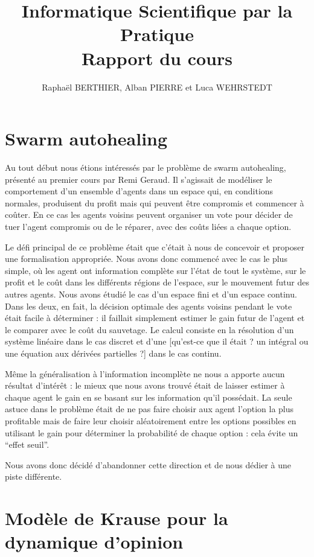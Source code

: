 \documentclass[a4paper,10pt]{article}
\title{Informatique Scientifique par la Pratique\\Rapport du cours}
\author{Raphaël BERTHIER, Alban PIERRE et Luca WEHRSTEDT}
\begin{document}
\maketitle

\section{Swarm autohealing}

Au tout début nous étions intéressés par le problème de swarm autohealing, présenté au premier cours par Remi Geraud. Il s'agissait de modéliser le comportement d'un ensemble d'agents dans un espace qui, en conditions normales, produisent du profit mais qui peuvent être compromis et commencer à coûter. En ce cas les agents voisins peuvent organiser un vote pour décider de tuer l'agent compromis ou de le réparer, avec des coûts liées a chaque option.

Le défi principal de ce problème était que c’était à nous de concevoir et proposer une formalisation appropriée. Nous avons donc commencé avec le cas le plus simple, où les agent ont information complète sur l’état de tout le système, sur le profit et le coût dans les différents régions de l'espace, sur le mouvement futur des autres agents. Nous avons étudié le cas d'un espace fini et d'un espace continu. Dans les deux, en fait, la décision optimale des agents voisins pendant le vote était facile à déterminer : il faillait simplement estimer le gain futur de l'agent et le comparer avec le coût du sauvetage. Le calcul consiste en la résolution d'un système linéaire dans le cas discret et d'une [qu'est-ce que il était ? un intégral ou une équation aux dérivées partielles ?] dans le cas continu.

Même la généralisation à l'information incomplète ne nous a apporte aucun résultat d’intérêt : le mieux que nous avons trouvé était de laisser estimer à chaque agent le gain en se basant sur les information qu'il possédait. La seule astuce dans le problème était de ne pas faire choisir aux agent l'option la plus profitable mais de faire leur choisir aléatoirement entre les options possibles en utilisant le gain pour déterminer la probabilité de chaque option : cela évite un ``effet seuil''.

Nous avons donc décidé d'abandonner cette direction et de nous dédier à une piste différente.

\section{Modèle de Krause pour la dynamique d'opinion}
\end{document}
